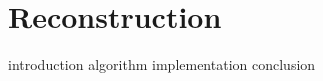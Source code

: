 \documentclass[a4paper, openany, oneside]{memoir}
\begin{document}
\chapter{Reconstruction}
\label{cha:reconstruction}

{introduction}
{algorithm}
{implementation}
{conclusion}
\end{document}
